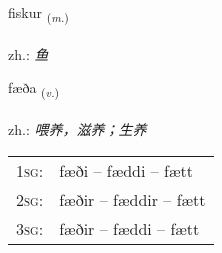 \documentclass[frontgrid, backgrid]{flacards}\usepackage[]{graphicx}\usepackage[]{xcolor}
\begin{document}
\renewcommand{\flhead}{\vskip5pt \fboxsep=0pt {\small\bfseries\footnotesize Nafnorð | 名词}}
\renewcommand{\fcfoot}{\vskip5pt \fboxsep=0pt \hspace{2pt}{\small\bfseries\footnotesize 1K}}

\renewcommand{\blhead}{\vskip5pt {\small\bfseries\footnotesize Nafnorð | 名词 }}
\renewcommand{\bcfoot}{\vskip5pt \hspace{2pt}{\small\bfseries\footnotesize 1K}}


{fiskur \small{\textsubscript{(\textit{m.})}} \\[1ex] %
\textphonetic{[fɪskʏr]} \\
zh.: \emph{鱼} \\  [2ex]
\renewcommand*{\arraystretch}{0.8}
}

\renewcommand{\flhead}{\vskip5pt \fboxsep=0pt {\small\bfseries\footnotesize Sagnorð | 动词}}
\renewcommand{\fcfoot}{\vskip5pt \fboxsep=0pt \hspace{2pt}{\small\bfseries\footnotesize 1K}}

\renewcommand{\blhead}{\vskip5pt {\small\bfseries\footnotesize Sagnorð | 动词 }}
\renewcommand{\bcfoot}{\vskip5pt \hspace{2pt}{\small\bfseries\footnotesize 1K}}


{fæða \small{\textsubscript{(\textit{v.})}} \\[1ex] %
\textphonetic{[faiːða]} \\
zh.: \emph{喂养，滋养；生养} \\  [2ex]
\renewcommand*{\arraystretch}{0.8}
\begin{tabular}{p{1cm}l}
\textsc{1sg}: & fæði -- fæddi -- fætt \\ 
\textsc{2sg}: & fæðir -- fæddir -- fætt \\ 
\textsc{3sg}: & fæðir -- fæddi -- fætt \\ 
\end{tabular}
}
\end{document}
